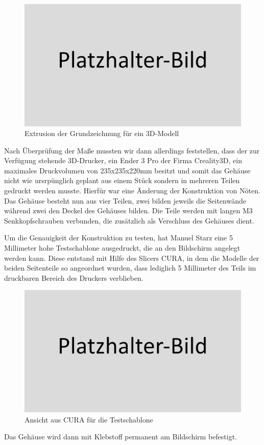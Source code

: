 \documentclass[12pt,a4paper]{article}
\begin{document}
	\begin{figure}
		\includegraphics[width=1\textwidth]{placeholder.png}
		\caption[Extrusion der Grundzeichnung für ein 3D-Modell]{Extrusion der Grundzeichnung für ein 3D-Modell}
		\label{fig:case-step-1}
	\end{figure}
	Nach Überprüfung der Maße mussten wir dann allerdings feststellen, dass der zur Verfügung stehende 3D-Drucker, ein Ender 3 Pro der Firma Creality3D, ein maximales Druckvolumen von 235x235x220mm besitzt und somit das Gehäuse nicht wie ursrpünglich geplant aus einem Stück sondern in mehreren Teilen gedruckt werden musste. Hierfür war eine Änderung der Konstruktion von Nöten. Das Gehäuse besteht nun aus vier Teilen, zwei bilden jeweils die Seitenwände während zwei den Deckel des Gehäuses bilden. Die Teile werden mit langen M3 Senkkopfschrauben verbunden, die zusätzlich als Verschluss des Gehäuses dient. \par
	Um die Genauigkeit der Konstruktion zu testen, hat Manuel Starz eine 5 Millimeter hohe Testschablone ausgedruckt, die an den Bildschirm angelegt werden kann. Diese entstand mit Hilfe des Slicers CURA, in dem die Modelle der beiden Seitenteile so angeordnet wurden, dass lediglich 5 Millimeter des Teils im druckbaren Bereich des Druckers verblieben.
	\begin{figure}
		\includegraphics[width=1\textwidth]{placeholder.png}
		\caption[Ansicht aus CURA für die Testschablone]{Ansicht aus CURA für die Testschablone}
		\label{fig:print-case-test}
	\end{figure}
	Das Gehäuse wird dann mit Klebstoff permanent am Bildschirm befestigt.
\end{document}
